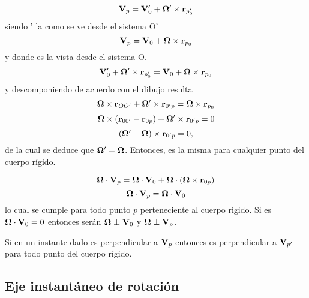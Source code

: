 \documentclass[10pt,oneside]{CBFT_article}
\begin{document}
\[
	\vb{V}_{p} = \vb{V}_0' + \vb{\Omega}' \times \vb{r}_{p_0'}
\]
siendo \vb{\Omega}' la \vb{\Omega} como se ve desde el sistema O'
\[
	\vb{V}_{p} = \vb{V}_0 + \vb{\Omega} \times \vb{r}_{p_0}
\]
y donde \vb{\Omega} es la vista desde el sistema O.
\[
	\vb{V}_0' + \vb{\Omega}' \times \vb{r}_{p_0'} = \vb{V}_0 + \vb{\Omega} \times \vb{r}_{p_0} 
\]
y descomponiendo de acuerdo con el dibujo resulta 
\[
	\vb{\Omega} \times \vb{r}_{OO'} + \vb{\Omega}' \times \vb{r}_{0'p} = \vb{\Omega} \times \vb{r}_{p_0} 
\]
\[
	\vb{\Omega} \times ( \vb{r}_{00'} - \vb{r}_{0p} ) + \vb{\Omega}' \times \vb{r}_{0'p}  = 0
\]
\[
	( \vb{\Omega}' - \vb{\Omega}  ) \times \vb{r}_{0'p} = 0 ,
\]
de la cual se deduce que $\vb{\Omega}'=\vb{\Omega}$. Entonces, \vb{\Omega} es la misma para cualquier
punto del cuerpo rígido.

\[
	\vb{\Omega} \cdot \vb{V}_p = \vb{\Omega} \cdot \vb{V}_0  + \vb{\Omega}\cdot(\vb{\Omega}\times \vb{r}_{0p} )
\]
\[
	\vb{\Omega} \cdot \vb{V}_p = \vb{\Omega} \cdot \vb{V}_0
\]
lo cual se cumple para todo punto $p$ perteneciente al cuerpo rigido. Si es $\vb{\Omega} \cdot \vb{V}_0 = 0$
entonces serán $\vb{\Omega} \perp \vb{V}_0$ y $\vb{\Omega} \perp \vb{V}_p$.

Si en un instante dado \vb{\Omega} es perpendicular a $\vb{V}_p$ entonces \vb{\Omega} es perpendicular a 
$\vb{V}_{p'}$ para todo punto del cuerpo rígido.

\subsection{Eje instantáneo de rotación}












\end{document}
